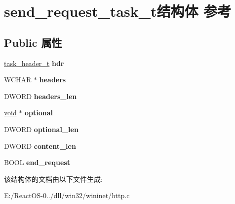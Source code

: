 \hypertarget{structsend__request__task__t}{}\section{send\+\_\+request\+\_\+task\+\_\+t结构体 参考}
\label{structsend__request__task__t}
\subsection*{Public 属性}
\begin{DoxyCompactItemize}
\item 
\mbox{\label{structsend__request__task__t_a92afa59d6b2cb1d1f973e1534072ac65}} 
\hyperlink{structtask__header__t}{task\+\_\+header\+\_\+t} {\bfseries hdr}
\item 
\mbox{\label{structsend__request__task__t_a6e1c81b7ff40bebae7929a94806420cb}} 
W\+C\+H\+AR $\ast$ {\bfseries headers}
\item 
\mbox{\label{structsend__request__task__t_ab15878833e3b4ff511196c0aca0697d2}} 
D\+W\+O\+RD {\bfseries headers\+\_\+len}
\item 
\mbox{\label{structsend__request__task__t_a39447703ad882aff6b21545745b14a04}} 
\hyperlink{interfacevoid}{void} $\ast$ {\bfseries optional}
\item 
\mbox{\label{structsend__request__task__t_aaef539577f98214998db8da4732c8460}} 
D\+W\+O\+RD {\bfseries optional\+\_\+len}
\item 
\mbox{\label{structsend__request__task__t_a304989da8f347b28ab136d50cc49e6e6}} 
D\+W\+O\+RD {\bfseries content\+\_\+len}
\item 
\mbox{\label{structsend__request__task__t_a14e6fd0c3106c099b65f12cd266727e0}} 
B\+O\+OL {\bfseries end\+\_\+request}
\end{DoxyCompactItemize}


该结构体的文档由以下文件生成\+:\begin{DoxyCompactItemize}
\item 
E\+:/\+React\+O\+S-\/0../dll/win32/wininet/http.\+c\end{DoxyCompactItemize}
